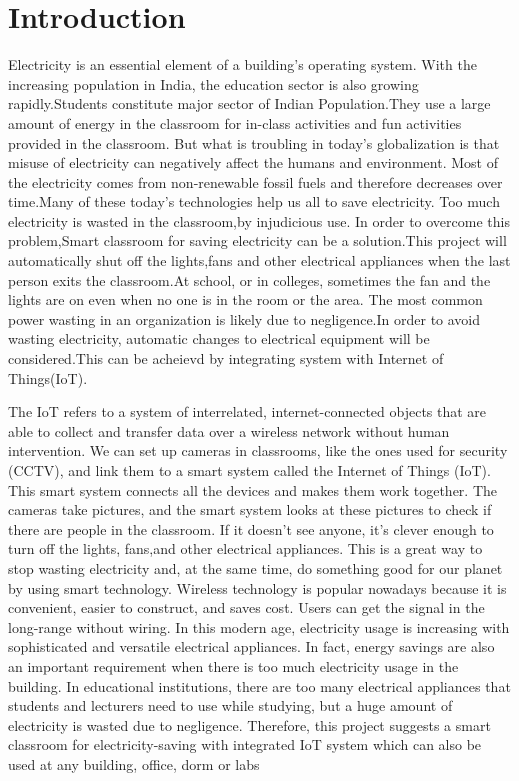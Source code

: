 \documentclass[12pt,a4paper]{report}
\begin{document}
\section*{Introduction}
Electricity is an essential element of a building's operating system. With the increasing
population in India, the education sector is also growing rapidly.Students constitute major
sector of Indian Population.They use a large amount of energy in the classroom for in-class
activities and fun activities provided in the classroom. But what is troubling in today's
globalization is that misuse of electricity can negatively affect the humans and environment.
Most of the electricity comes from non-renewable fossil fuels and therefore decreases over
time.Many of these today's technologies help us all to save electricity. Too much electricity is
wasted in the classroom,by injudicious use. In order to overcome this problem,Smart
classroom for saving electricity can be a solution.This project will automatically shut off the
lights,fans and other electrical appliances when the last person exits the classroom.At school,
or in colleges, sometimes the fan and the lights are on even when no one is in the room or
the area. The most common power wasting in an organization is likely due to negligence.In
order to avoid wasting electricity, automatic changes to electrical equipment will be
considered.This can be acheievd by integrating system with Internet of Things(IoT).\\
\par
The IoT refers to a system of interrelated, internet-connected objects that are able to collect and
transfer data over a wireless network without human intervention. We can set up cameras in
classrooms, like the ones used for security (CCTV), and link them to a smart system called
the Internet of Things (IoT). This smart system connects all the devices and makes them
work together. The cameras take pictures, and the smart system looks at these pictures to
check if there are people in the classroom. If it doesn't see anyone, it's clever enough to turn
off the lights, fans,and other electrical appliances. This is a great way to stop wasting
electricity and, at the same time, do something good for our planet by using smart technology.
Wireless technology is popular nowadays because it is convenient, easier to construct, and
saves cost. Users can get the signal in the long-range without wiring. In this modern age,
electricity usage is increasing with sophisticated and versatile electrical appliances. In fact,
energy savings are also an important requirement when there is too much electricity usage in
the building. In educational institutions, there are too many electrical appliances that students
and lecturers need to use while studying, but a huge amount of electricity is wasted due to
negligence. Therefore, this project suggests a smart classroom for electricity-saving with
integrated IoT system which can also be used at any building, office, dorm or labs 
\end{document}
